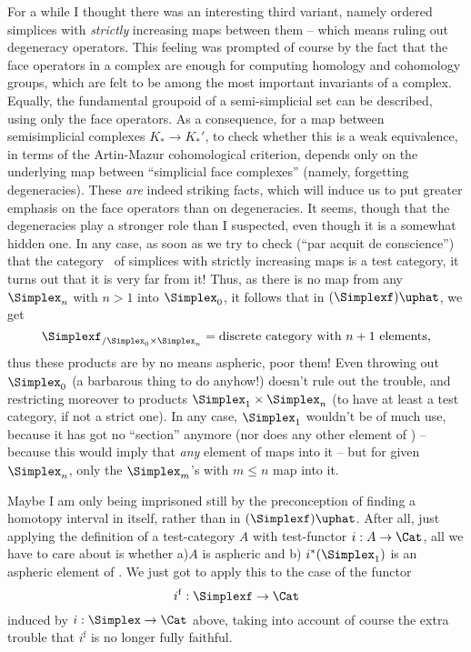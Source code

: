 For a while I thought there was an interesting third variant, namely
ordered simplices with \emph{strictly} increasing maps between them --
which means ruling out degeneracy operators. This feeling was prompted
of course by the fact that the face operators in a complex are enough
for computing homology and cohomology groups, which are felt to be
among the most important invariants of a complex. Equally, the
fundamental groupoid of a semi-simplicial set can be described, using
only the face operators. As a consequence, for a map between
semisimplicial complexes $K_*\to K_*'$, to check whether this is a
weak equivalence, in terms of the Artin-Mazur cohomological criterion,
depends only on the underlying map between ``simplicial face
complexes'' (namely, forgetting degeneracies). These \emph{are} indeed
striking facts, which will induce us to put greater emphasis on the
face operators than on degeneracies. It seems, though that the
degeneracies play a stronger role than I suspected, even though it is
a somewhat hidden one. In any case, as soon as we try to check (``par
acquit de conscience'') that the category \Simplexf\ of simplices with
strictly increasing maps is a test category, it turns out that it is
very far from it! Thus, as there is no map from any $\Simplex_n$ with
$n>1$ into $\Simplex_0$, it follows that in
$(\Simplexf)\uphat$, we get
\[\Simplexf_{/\Simplex_0\times\Simplex_n} = \text{discrete category with
  $n+1$ elements,}\]
thus these products are by no means aspheric, poor them! Even throwing
out $\Simplex_0$ (a barbarous thing to do anyhow!) doesn't rule out the
trouble, and restricting moreover to products $\Simplex_1\times\Simplex_n$
(to have at least a test category, if not a strict one). In any case,
$\Simplex_1$ wouldn't be of much use, because it has got no ``section''
anymore (nor does any other element of \Simplexf) -- because this would
imply that \emph{any} element of \Simplexf{} maps into it -- but for
given $\Simplex_n$, only the $\Simplex_m$'s with $m\le n$
map into it.

Maybe I am only being imprisoned still by the preconception of finding
a homotopy interval in \Simplexf{} itself, rather than in
$(\Simplexf)\uphat$. After all, just applying the definition of a
test-category $A$ with test-functor $i:A\to\Cat$, all we have to care
about is whether a)\enspace $A$ is aspheric and b)\enspace
$i^*(\Simplex_1)$ is an aspheric element of \Ahat. We just got to
apply this to the case of the functor
\[ i^{\mathrm f} : \Simplexf \to \Cat\]
induced by $i:\Simplex\to\Cat$ above, taking into account of course the
extra trouble that $i^{\mathrm f}$ is no longer fully faithful.

